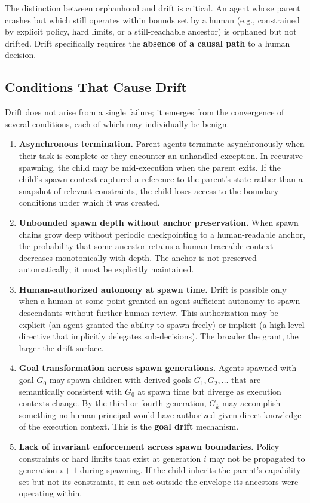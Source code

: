 The distinction between orphanhood and drift is critical. An agent whose parent crashes but which still operates within bounds set by a human (e.g., constrained by explicit policy, hard limits, or a still-reachable ancestor) is orphaned but not drifted. Drift specifically requires the \textbf{absence of a causal path} to a human decision.

\subsection{Conditions That Cause Drift}

Drift does not arise from a single failure; it emerges from the convergence of several conditions, each of which may individually be benign.

\begin{enumerate}
\item \textbf{Asynchronous termination.} Parent agents terminate asynchronously when their task is complete or they encounter an unhandled exception. In recursive spawning, the child may be mid-execution when the parent exits. If the child's spawn context captured a reference to the parent's state rather than a snapshot of relevant constraints, the child loses access to the boundary conditions under which it was created.

\item \textbf{Unbounded spawn depth without anchor preservation.} When spawn chains grow deep without periodic checkpointing to a human-readable anchor, the probability that some ancestor retains a human-traceable context decreases monotonically with depth. The anchor is not preserved automatically; it must be explicitly maintained.

\item \textbf{Human-authorized autonomy at spawn time.} Drift is possible only when a human at some point granted an agent sufficient autonomy to spawn descendants without further human review. This authorization may be explicit (an agent granted the ability to spawn freely) or implicit (a high-level directive that implicitly delegates sub-decisions). The broader the grant, the larger the drift surface.

\item \textbf{Goal transformation across spawn generations.} Agents spawned with goal $G_0$ may spawn children with derived goals $G_1, G_2, \ldots$ that are semantically consistent with $G_0$ at spawn time but diverge as execution contexts change. By the third or fourth generation, $G_k$ may accomplish something no human principal would have authorized given direct knowledge of the execution context. This is the \textbf{goal drift} mechanism.

\item \textbf{Lack of invariant enforcement across spawn boundaries.} Policy constraints or hard limits that exist at generation $i$ may not be propagated to generation $i+1$ during spawning. If the child inherits the parent's capability set but not its constraints, it can act outside the envelope its ancestors were operating within.
\end{enumerate}

